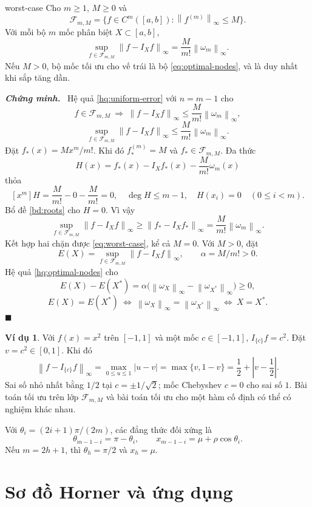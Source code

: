 \documentclass[12pt,a4paper,oneside]{book}
\numberwithin{algorithm}{chapter}
\theoremstyle{definition}
\newtheorem{vidu}{Ví dụ}[chapter]
\newenvironment{chungminh}{\par\medskip\noindent\textbf{\textit{\color{mainblue}Chứng minh.}}\ }{\hfill$\blacksquare$\par\medskip}
\newcommand{\norminf}[1]{\left\lVert #1\right\rVert_{\infty}}
\begin{document}
\begin{dinhly}{}{worst-case}
Cho $m\geq1$, $M\geq0$ và
\[
 \mathcal F_{m,M}=\{f\in C^m([a,b]):\norminf{f^{(m)}}\leq M\}.
\]
Với mỗi bộ $m$ mốc phân biệt $X\subset[a,b]$,
\begin{equation}\label{eq:worst-case}
 \sup_{f\in\mathcal F_{m,M}}\norminf{f-I_Xf}
 =\frac{M}{m!}\norminf{\omega_m}.
\end{equation}
Nếu $M>0$, bộ mốc tối ưu cho vế trái là bộ \eqref{eq:optimal-nodes}, và là duy nhất khi sắp tăng dần.
\end{dinhly}
\begin{chungminh}
Hệ quả \ref{hq:uniform-error} với $n=m-1$ cho
\[
 f\in\mathcal F_{m,M}\ \Longrightarrow\
 \norminf{f-I_Xf}\leq\frac{M}{m!}\norminf{\omega_m},
\]
\[
 \sup_{f\in\mathcal F_{m,M}}\norminf{f-I_Xf}
 \leq\frac{M}{m!}\norminf{\omega_m}.
\]
Đặt $f_*(x)=Mx^m/m!$. Khi đó $f_*^{(m)}=M$ và $f_*\in\mathcal F_{m,M}$. Đa thức
\[
 H(x)=f_*(x)-I_Xf_*(x)-\frac{M}{m!}\omega_m(x)
\]
thỏa
\[
 [x^m]H=\frac{M}{m!}-0-\frac{M}{m!}=0,\quad
 \deg H\leq m-1,\quad H(x_i)=0\quad(0\leq i<m).
\]
Bổ đề \ref{bd:roots} cho $H=0$. Vì vậy
\[
 \sup_{f\in\mathcal F_{m,M}}\norminf{f-I_Xf}
 \geq\norminf{f_*-I_Xf_*}
 =\frac{M}{m!}\norminf{\omega_m}.
\]
Kết hợp hai chặn được \eqref{eq:worst-case}, kể cả $M=0$. Với $M>0$, đặt
\[
 E(X)=\sup_{f\in\mathcal F_{m,M}}\norminf{f-I_Xf},\qquad
 \alpha=M/m!>0.
\]
Hệ quả \ref{hq:optimal-nodes} cho
\[
 E(X)-E(X^*)=\alpha\bigl(\norminf{\omega_X}-\norminf{\omega_{X^*}}\bigr)\geq0,
\]
\[
 E(X)=E(X^*)\ \Longleftrightarrow\
 \norminf{\omega_X}=\norminf{\omega_{X^*}}
 \ \Longleftrightarrow\ X=X^*.
\]
\end{chungminh}

\begin{vidu}
Với $f(x)=x^2$ trên $[-1,1]$ và một mốc $c\in[-1,1]$, $I_{\{c\}}f=c^2$. Đặt $v=c^2\in[0,1]$. Khi đó
\[
 \norminf{f-I_{\{c\}}f}
 =\max_{0\leq u\leq1}|u-v|
 =\max\{v,1-v\}=\frac12+\left|v-\frac12\right|.
\]
Sai số nhỏ nhất bằng $1/2$ tại $c=\pm1/\sqrt2$; mốc Chebyshev $c=0$ cho sai số $1$. Bài toán tối ưu trên lớp $\mathcal F_{m,M}$ và bài toán tối ưu cho một hàm cố định có thể có nghiệm khác nhau.

\end{vidu}

Với $\theta_i=(2i+1)\pi/(2m)$, các đẳng thức đối xứng là
\[
 \theta_{m-1-i}=\pi-\theta_i,\qquad
 x_{m-1-i}=\mu+\rho\cos\theta_i.
\]
Nếu $m=2h+1$, thì $\theta_h=\pi/2$ và $x_h=\mu$.

\section{Sơ đồ Horner và ứng dụng}
\end{document}
